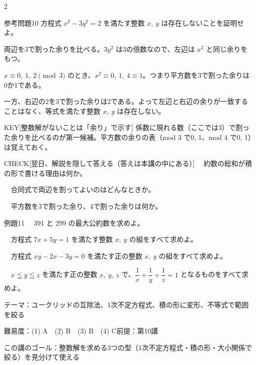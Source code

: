 \documentclass[paper=b5j, fontsize=8pt, fleqn, twoside]{jlreq}
\begin{document}
\begin{multicols*}{2}
  \begin{simple}[出典：オリジナル]{参考問題10}
    方程式 $x^2-3y^2=2$ を満たす整数 $x,\ y$ は存在しないことを証明せよ。
  \end{simple}
  \Kai
  両辺を3で割った余りを比べる。$3y^2$ は3の倍数なので、左辺は $x^2$ と同じ余りをもつ。\par
  $x\equiv0,\ 1,\ 2\pmod3$ のとき、$x^2\equiv0,\ 1,\ 4\equiv1$。つまり平方数を3で割った余りは0か1である。\par
  一方、右辺の2を3で割った余りは2である。よって左辺と右辺の余りが一致することはなく、等式を満たす整数 $x,\ y$ は存在しない。\QED
  \begin{ptbs}{KEY}[整数解がないことは「余り」で示す]
    係数に現れる数（ここでは3）で割った余りを比べるのが第一候補。平方数の余りの表（mod 3 で0, 1、mod 4 で0, 1）は覚えておく。
  \end{ptbs}

  \begin{ptbs}{CHECK}[翌日、解説を隠して答える（答えは本講の中にある）]
    　約数の総和が積の形で書ける理由は何か。\par
    　合同式で両辺を割ってよいのはどんなときか。\par
    　平方数を3で割った余り、4で割った余りは何か。
  \end{ptbs}

  \notefill
\end{multicols*}

\begin{ascolorbox4A}[出典：オリジナル]{例題11}
  　391 と 299 の最大公約数を求めよ。\par
  　方程式 $7x+5y=1$ を満たす整数 $x,\ y$ の組をすべて求めよ。\par
  　方程式 $xy-2x-3y=0$ を満たす正の整数 $x,\ y$ の組をすべて求めよ。\par
  　$x\leqq y\leqq z$ を満たす正の整数 $x,\ y,\ z$ で、$\dfrac1x+\dfrac1y+\dfrac1z=1$ となるものをすべて求めよ。
\end{ascolorbox4A}

\begin{Data}
  テーマ：ユークリッドの互除法、1次不定方程式、積の形に変形、不等式で範囲を絞る\par
  難易度：(1) A　(2) B　(3) B　(4) C\quad 前提：第10講\par
  この講のゴール：整数解を求める3つの型（1次不定方程式・積の形・大小関係で絞る）を見分けて使える
\end{Data}
\end{document}
